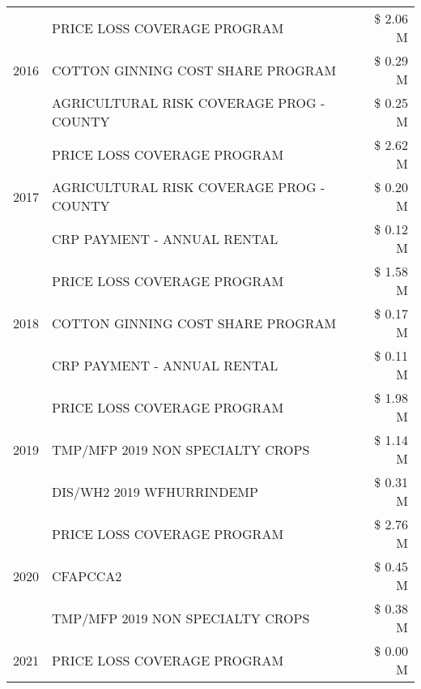 \begin{tabular}{llr}
\multirow[t]{3}{*}{2016} & PRICE LOSS COVERAGE PROGRAM                   & \$ 2.06 M \\
 & COTTON GINNING COST SHARE PROGRAM             & \$ 0.29 M \\
 & AGRICULTURAL RISK COVERAGE PROG - COUNTY      & \$ 0.25 M \\
\cline{1-3}
\multirow[t]{3}{*}{2017} & PRICE LOSS COVERAGE PROGRAM & \$ 2.62 M \\
 & AGRICULTURAL RISK COVERAGE PROG - COUNTY & \$ 0.20 M \\
 & CRP PAYMENT - ANNUAL RENTAL & \$ 0.12 M \\
\cline{1-3}
\multirow[t]{3}{*}{2018} & PRICE LOSS COVERAGE PROGRAM & \$ 1.58 M \\
 & COTTON GINNING COST SHARE PROGRAM & \$ 0.17 M \\
 & CRP PAYMENT - ANNUAL RENTAL & \$ 0.11 M \\
\cline{1-3}
\multirow[t]{3}{*}{2019} & PRICE LOSS COVERAGE PROGRAM & \$ 1.98 M \\
 & TMP/MFP 2019 NON SPECIALTY CROPS & \$ 1.14 M \\
 & DIS/WH2 2019 WFHURRINDEMP & \$ 0.31 M \\
\cline{1-3}
\multirow[t]{3}{*}{2020} & PRICE LOSS COVERAGE PROGRAM & \$ 2.76 M \\
 & CFAPCCA2 & \$ 0.45 M \\
 & TMP/MFP 2019 NON SPECIALTY CROPS & \$ 0.38 M \\
\cline{1-3}
2021 & PRICE LOSS COVERAGE PROGRAM & \$ 0.00 M \\
\cline{1-3}
\bottomrule
\end{tabular}
